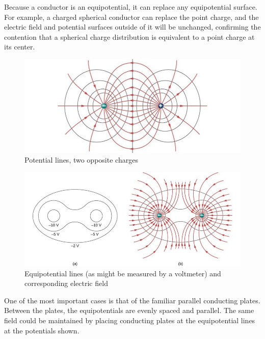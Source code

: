 \documentclass[14pt]{memoir}
\begin{document}
Because a conductor is an equipotential, it can replace any equipotential surface. For example, a charged spherical conductor can replace the point charge, and the electric field and potential surfaces outside of it will be unchanged, confirming the contention that a spherical charge distribution is equivalent to a point charge at its center.

\begin{figure}[H]
\begin{center}
\includegraphics[scale=0.50]{fig/fig_07_31.jpg}
\caption{Potential lines, two opposite charges}
\label{fig:07_31}
\end{center}
\end{figure}



\begin{figure}[H]
\begin{center}
\includegraphics[scale=0.50]{fig/fig_07_32.jpg}
\caption{Equipotential lines (as might be measured by a voltmeter) and corresponding electric field}
\label{fig:07_32}
\end{center}
\end{figure}

One of the most important cases is that of the familiar parallel conducting plates. Between the plates, the equipotentials are evenly spaced and parallel. The same field could be maintained by
placing conducting plates at the equipotential lines at the potentials shown.
\end{document}
